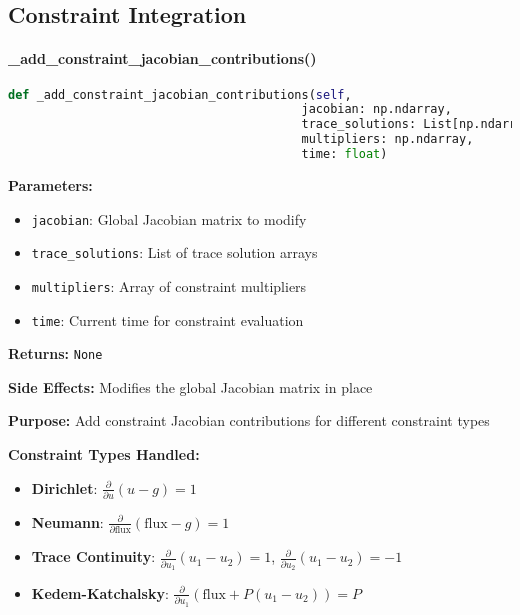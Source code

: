 \subsection{Constraint Integration}
\label{subsec:constraint_integration}

\paragraph{\_add\_constraint\_jacobian\_contributions()}\leavevmode
\begin{lstlisting}[language=Python, caption=Add Constraint Jacobian Contributions Method]
def _add_constraint_jacobian_contributions(self, 
                                         jacobian: np.ndarray,
                                         trace_solutions: List[np.ndarray],
                                         multipliers: np.ndarray,
                                         time: float)
\end{lstlisting}

\textbf{Parameters:}
\begin{itemize}
    \item \texttt{jacobian}: Global Jacobian matrix to modify
    \item \texttt{trace\_solutions}: List of trace solution arrays
    \item \texttt{multipliers}: Array of constraint multipliers
    \item \texttt{time}: Current time for constraint evaluation
\end{itemize}

\textbf{Returns:} \texttt{None}

\textbf{Side Effects:} Modifies the global Jacobian matrix in place

\textbf{Purpose:} Add constraint Jacobian contributions for different constraint types

\textbf{Constraint Types Handled:}
\begin{itemize}
    \item \textbf{Dirichlet}: $\frac{\partial}{\partial u}(u - g) = 1$
    \item \textbf{Neumann}: $\frac{\partial}{\partial \text{flux}}(\text{flux} - g) = 1$
    \item \textbf{Trace Continuity}: $\frac{\partial}{\partial u_1}(u_1 - u_2) = 1$, $\frac{\partial}{\partial u_2}(u_1 - u_2) = -1$
    \item \textbf{Kedem-Katchalsky}: $\frac{\partial}{\partial u_1}(\text{flux} + P(u_1 - u_2)) = P$
\end{itemize}

